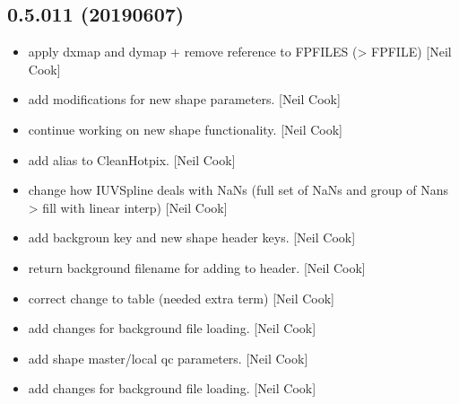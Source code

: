 \documentclass[a4paper,10pt,english]{report}
\begin{document}
\subsection{0.5.011 (2019\sphinxhyphen{}06\sphinxhyphen{}07)}
\label{\detokenize{misc/changelog:id145}}\begin{itemize}
\item {} 
 \sphinxhyphen{} apply dxmap and dymap + remove reference to
FPFILES (\textendash{}\textgreater{} FPFILE) {[}Neil Cook{]}

\item {} 
 \sphinxhyphen{} add modifications for new shape parameters. {[}Neil
Cook{]}

\item {} 
 \sphinxhyphen{} continue working on new shape functionality. {[}Neil
Cook{]}

\item {} 
 \sphinxhyphen{} add alias to CleanHotpix. {[}Neil Cook{]}

\item {} 
 \sphinxhyphen{} change how IUVSpline deals with NaNs (full set of NaNs
and group of Nans \textendash{}\textgreater{} fill with linear interp) {[}Neil Cook{]}

\item {} 
 \sphinxhyphen{} add backgroun key and new shape header keys. {[}Neil
Cook{]}

\item {} 
 \sphinxhyphen{} return background filename for adding to header. {[}Neil
Cook{]}

\item {} 
 \sphinxhyphen{} correct change to table (needed extra term)
{[}Neil Cook{]}

\item {} 
 \sphinxhyphen{} add changes for background file loading.
{[}Neil Cook{]}

\item {} 
 \sphinxhyphen{} add shape master/local qc parameters. {[}Neil
Cook{]}

\item {} 
 \sphinxhyphen{} add changes for background file loading. {[}Neil
Cook{]}


\end{itemize}
\end{document}
